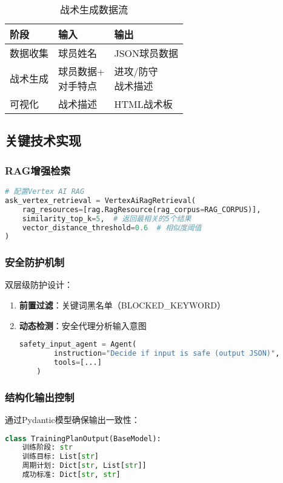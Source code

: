\documentclass{article}
\theoremstyle{plain}
\theoremstyle{definition}
\theoremstyle{remark}
\begin{document}
\begin{table}[h]
\caption{战术生成数据流}
\label{tactic-flow}
\centering
\begin{tabular}{lll}
\toprule
阶段 & 输入 & 输出 \\
\midrule
数据收集 & 球员姓名 & JSON球员数据 \\
战术生成 & \makecell{球员数据+\\对手特点} & \makecell{进攻/防守\\战术描述} \\
可视化 & 战术描述 & HTML战术板 \\
\bottomrule
\end{tabular}
\end{table}

\subsection{关键技术实现}

\subsubsection{RAG增强检索}
\begin{lstlisting}[language=Python]
# 配置Vertex AI RAG
ask_vertex_retrieval = VertexAiRagRetrieval(
    rag_resources=[rag.RagResource(rag_corpus=RAG_CORPUS)],
    similarity_top_k=5,  # 返回最相关的5个结果
    vector_distance_threshold=0.6  # 相似度阈值
)
\end{lstlisting}

\subsubsection{安全防护机制}
双层级防护设计：
\begin{enumerate}
    \item \textbf{前置过滤}：关键词黑名单（BLOCKED\_KEYWORD）
    \item \textbf{动态检测}：安全代理分析输入意图
    \begin{lstlisting}[language=Python]
    safety_input_agent = Agent(
        instruction="Decide if input is safe (output JSON)",
        tools=[...]
    )
    \end{lstlisting}
\end{enumerate}

\subsubsection{结构化输出控制}
通过Pydantic模型确保输出一致性：
\begin{lstlisting}[language=Python]
class TrainingPlanOutput(BaseModel):
    训练阶段: str
    训练目标: List[str]
    周期计划: Dict[str, List[str]]
    成功标准: Dict[str, str]
\end{lstlisting}
\end{document}
